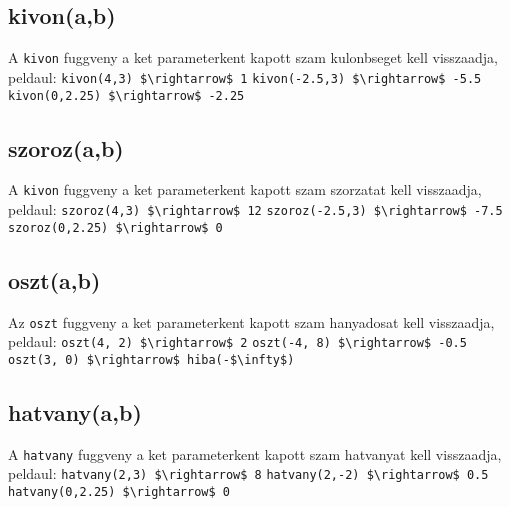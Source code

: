 \documentclass{article}
\begin{document}
\subsection{kivon(a,b)}
A \lstinline{kivon} fuggveny a ket parameterkent kapott szam kulonbseget kell visszaadja, peldaul:\newline
\lstinline[mathescape]{kivon(4,3) $\rightarrow$ 1}\newline
\lstinline[mathescape]{kivon(-2.5,3) $\rightarrow$ -5.5}\newline
\lstinline[mathescape]{kivon(0,2.25) $\rightarrow$ -2.25}\newline

\subsection{szoroz(a,b)}
A \lstinline{kivon} fuggveny a ket parameterkent kapott szam szorzatat kell visszaadja, peldaul:\newline
\lstinline[mathescape]{szoroz(4,3) $\rightarrow$ 12}\newline
\lstinline[mathescape]{szoroz(-2.5,3) $\rightarrow$ -7.5}\newline
\lstinline[mathescape]{szoroz(0,2.25) $\rightarrow$ 0}\newline

\subsection{oszt(a,b)}
Az \lstinline{oszt} fuggveny a ket parameterkent kapott szam hanyadosat kell visszaadja, peldaul:\newline
\lstinline[mathescape]{oszt(4, 2) $\rightarrow$ 2}\newline
\lstinline[mathescape]{oszt(-4, 8) $\rightarrow$ -0.5}\newline
\lstinline[mathescape]{oszt(3, 0) $\rightarrow$ hiba(-$\infty$)}\newline

\subsection{hatvany(a,b)}
A \lstinline{hatvany} fuggveny a ket parameterkent kapott szam hatvanyat kell visszaadja, peldaul:\newline
\lstinline[mathescape]{hatvany(2,3) $\rightarrow$ 8}\newline
\lstinline[mathescape]{hatvany(2,-2) $\rightarrow$ 0.5}\newline
\lstinline[mathescape]{hatvany(0,2.25) $\rightarrow$ 0}\newline
\end{document}
